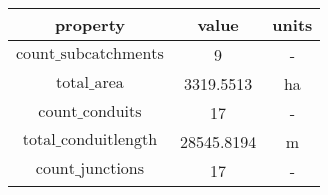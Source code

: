 \begin{tabular}{ccc}
property & value & units \\ 
\hline 
$\mathrm{count\_subcatchments}$ & 9 & - \\ 
$\mathrm{total\_area}$ & 3319.5513 & ha \\ 
$\mathrm{count\_conduits}$ & 17 & - \\ 
$\mathrm{total\_conduitlength}$ & 28545.8194 & m \\ 
$\mathrm{count\_junctions}$ & 17 & - \\ 
\hline 
\end{tabular}